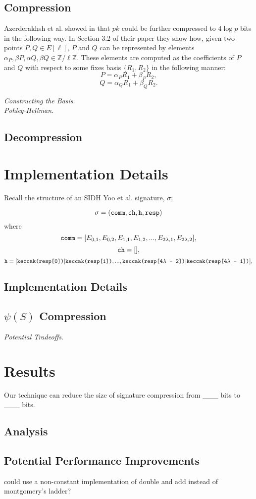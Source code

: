 \subsection{Compression}

Azerderakhsh et al. showed in \cite{compwr} that $pk$ could be further compressed to $4\log p$ bits in the following way. In Section 3.2 of their paper they show how, given two points $P, Q \in E[\ell]$, $P$ and $Q$ can be represented by elements $\alpha_{P}, \beta{P}, \alpha{Q}, \beta{Q} \in \mathbb{Z}/\ell\mathbb{Z}$. These elements are computed as the coefficients of $P$ and $Q$ with respect to some fixes basis $\{R_1, R_2\}$ in the following manner: 
$$
P = \alpha_{P}R_1 + \beta_{P}R_2,
$$
$$
Q = \alpha_{Q}R_1 + \beta_{Q}R_2.
$$

\noindent
\textit{Constructing the Basis}.\\

\noindent
\textit{Pohleg-Hellman}.

\subsection{Decompression}

\section{Implementation Details}
\label{sec:compimplementation}

Recall the structure of an SIDH Yoo et al. signature, $\sigma$;

$$
\sigma = (\texttt{comm}, \texttt{ch}, \texttt{h}, \texttt{resp})
$$
where
$$
\texttt{comm} = [E_{0, 1}, E_{0, 2}, E_{1, 1}, E_{1, 2}, ... , E_{2\lambda, 1}, E_{2\lambda, 2}],
$$
$$
\texttt{ch} = [],
$$
$$
\texttt{h} = [\texttt{keccak(resp[0])}|\texttt{keccak(resp[1])}, ... , \texttt{keccak(resp[4}\lambda\texttt{ - 2])}|\texttt{keccak(resp[4}\lambda\texttt{ - 1])}],
$$


\subsection{Implementation Details}

\subsection{$\psi(S)$ Compression}

\noindent
\textit{Potential Tradeoffs}.

\section{Results}

Our technique can reduce the size of \sidh signature compression from \_\_\_ bits to \_\_\_ bits.

\subsection{Analysis}

\subsection{Potential Performance Improvements}

could use a non-constant implementation of double and add instead of montgomery's ladder? 

